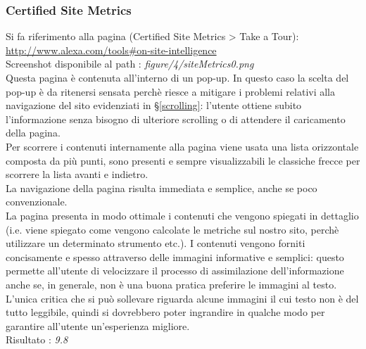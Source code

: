 \subsubsection{Certified Site Metrics}\label{metrics}
Si fa riferimento alla pagina (Certified Site Metrics > Take a Tour): \\
\url{http://www.alexa.com/tools#on-site-intelligence}
\\
Screenshot disponibile al path : \textit{figure/4/siteMetrics0.png} \\ 
Questa pagina è contenuta all'interno di un pop-up.
In questo caso la scelta del pop-up è da ritenersi sensata perchè riesce a 
mitigare i problemi relativi alla navigazione del sito evidenziati in 
§\ref{scrolling}: l'utente ottiene subito l'informazione senza
bisogno di ulteriore scrolling o di attendere il caricamento della pagina.\\
Per scorrere i contenuti internamente alla pagina viene usata una lista
 orizzontale composta da più punti, sono presenti e sempre
visualizzabili le classiche frecce per scorrere la lista avanti e indietro. \\
La navigazione della pagina risulta immediata e semplice, anche se poco
convenzionale. \\
La pagina presenta in modo ottimale i contenuti che vengono spiegati in 
dettaglio (i.e. viene spiegato come vengono calcolate le metriche sul
nostro sito, perchè utilizzare un determinato strumento etc.). I contenuti vengono
forniti concisamente e spesso attraverso delle immagini informative e
semplici: questo permette all'utente di velocizzare il processo di assimilazione
dell'informazione anche se, in generale, non è una buona pratica 
preferire le immagini al testo. L'unica critica che si può sollevare riguarda
alcune immagini il cui testo non è del tutto leggibile, quindi si dovrebbero
poter ingrandire in qualche modo per garantire all'utente un'esperienza migliore.
 \\
Risultato : \textit{9.8}